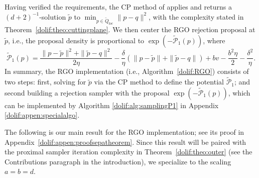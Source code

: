\documentclass[11pt,letterpaper]{article}
\newcommand{\local}{\mathrm{loc}}
\newcommand{\Q}{\widetilde{Q}}
\newcommand{\brac}[1]{\left( #1\right)}
\begin{document}
Having verified the requirements, the CP method of \cite{jiang2020cuttingplane} applies and returns a $(d+2)^{-1}$-solution $\tilde p$ to $\min_{p\in\Q_{\local}}\|p-q\|^2$, with the complexity stated in Theorem~\ref{dolif:theo:cuttingplane}. We then center the RGO rejection proposal at $\tilde p$, i.e., the proposal density is proportional to $\exp\!\left(-\widetilde{\mathcal{P}}_1(p)\right)$, where
\begin{equation}
\label{dolif:def:tildeP1}
\widetilde{\mathcal{P}}_1(p)
= \frac{\|p-\tilde p\|^2 + \|\tilde p-q\|^2}{2\eta}  -\frac{\delta}{\eta} (\|p-\tilde p\|+\|\tilde p-q\|) + bv-\frac{b^2\eta}{2}-\frac{\delta^2}{\eta}.
\end{equation}
In summary, the RGO implementation (i.e., Algorithm~\ref{dolif:RGO}) consists of two steps: first, solving for $\tilde{p}$ via the CP method to define the potential $\widetilde{\mathcal{P}}_1$; and second building a rejection sampler with the proposal $\exp\brac{-\widetilde{\mathcal{P}}_1(p)}$, which can be implemented by Algorithm \ref{dolif:alg:samplingP1} in Appendix \ref{dolif:appen:specialalgo}.


The following is our main result for the RGO implementation; see its proof in Appendix~\ref{dolif:appen:proofsepatheorem}. Since this result will be paired with the proximal sampler iteration complexity in Theorem~\ref{dolif:theo:outer} (see the Contributions paragraph in the introduction), we specialize to the scaling $a=b=d$.
\end{document}
